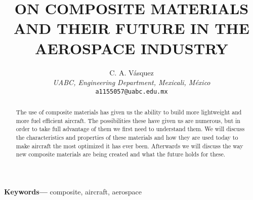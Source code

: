 \documentclass[letterpaper]{article}
\title{\textbf{ON COMPOSITE MATERIALS AND THEIR FUTURE IN THE AEROSPACE INDUSTRY}}
\author{C. A. Vásquez\\
\footnotesize {\textit{UABC, Engineering Department, Mexicali, México}}\\
\footnotesize \texttt{a1155057@uabc.edu.mx}}
\date{}
\begin{document}
\maketitle

\begin{abstract}
	The use of composite materials has given us the ability to build more lightweight and more fuel efficient aircraft. The possibilities these have given us are numerous, but in order to take full advantage of them we first need to understand them. We will discuss the characteristics and properties of these materials and how they are used today to make aircraft the most optimized it has ever been. Afterwards we will discuss the way new composite materials are being created and what the future holds for these.
\end{abstract}
	{\bf Keywords---} composite, aircraft, aerospace
\end{document}

